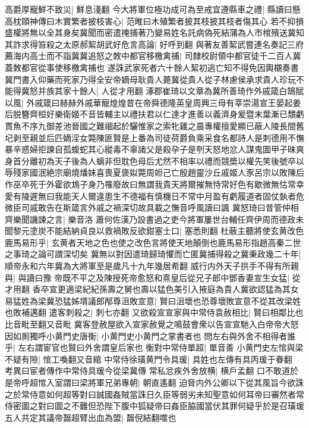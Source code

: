 高爵厚寵鮮不致災|{
	鮮息淺翻}
今大將軍位極功成可為至戒宜遵縣車之禮|{
	縣讀曰懸}
高枕頤神傳曰木實繁者披枝害心|{
	范睢曰木殖繁者披其枝披其枝者傷其心}
若不抑損盛權將無以全其身矣冀聞而密遣掩捕著乃變易姓名託病偽死結蒲為人市棺殯送冀知其詐求得笞殺之太原郝絜胡武好危言高論|{
	好呼到翻}
與著友善絜武嘗連名奏記三府薦海内高士而不詣冀冀追怒之敇中都官移檄禽捕|{
	司隸校尉領中都官徒千二百人冀蓋敇都官從事使移檄禽捕也}
遂誅武家死者六十餘人絜初逃亡知不得免因輿櫬奏書冀門書入仰藥而死家乃得全安帝嫡母耿貴人薨冀從貴人從子林慮侯承求貴人珍玩不能得冀怒并族其家十餘人|{
	人從才用翻}
涿郡崔琦以文章為冀所善琦作外戚箴白鵠賦以風|{
	外戚箴曰赫赫外戚華寵煌煌昔在帝舜德隆英皇周興三母有莘崇湯宣王晏起姜后脱簪齊桓好樂衛姬不音皆輔主以禮扶君以仁達才進善以義濟身爰暨末葉漸已穨虧貫魚不序九御差池晉國之難祻起於驪惟家之索牝雞之晨專權擅愛顯已蔽人陵長間舊圮剥至親並后匹嫡淫女斃陳匪賢是上番為司徒荷爵負乘采食名都詩人是刺德用不憮暴辛惑婦拒諫自孤蝮蛇其心縱毒不辜諸父是殺孕子是刳天怒地忿人謀鬼圖甲子昧爽身首分離初為天子後為人螭非但耽色母后尤然不相率以禮而競奬以權先笑後號卒以辱殘家國泯絶宗廟燒燔妹喜喪夏褒姒斃周妲己亡殷趙靈沙丘戚姬人豕呂宗以敗陳后作巫卒死于外霍欲鴆子身乃罹廢故曰無謂我貴天將爾摧無恃常好色有歇微無怙常幸愛有陵遲無曰我能天人爾違患生不德福有慎機日不常中月盈有虧履道者固仗埶者危微臣司戚敢告在斯箴言外戚之禍深切故具載之憮音呼風讀曰諷}
冀怒琦曰昔管仲相齊樂聞譏諫之言|{
	樂音洛}
蕭何佐漢乃設書過之吏今將軍屢世台輔任齊伊周而德政未聞黎元塗炭不能結納貞良以救禍敗反欲鉗塞士口|{
	塞悉則翻}
杜蔽主聽將使玄黄改色鹿馬易形乎|{
	玄黄者天地之色也使之改色言將使天地顛倒也鹿馬易形指趙高秦二世之事琦之論可謂深切矣}
冀無以對因遣琦歸琦懼而亡匿冀捕得殺之冀秉政幾二十年|{
	順帝永和六年冀為大將軍至是歲凡十九年幾居希翻}
威行内外天子拱手不得有所親與|{
	與讀曰豫}
帝既不平之及陳授死帝愈怒和熹皇后從兄子郎中鄧香妻宣生女猛|{
	從才用翻}
香卒宣更適梁紀紀孫壽之舅也壽以猛色美引入掖庭為貴人冀欲認猛為其女易猛姓為梁冀恐猛姊壻議郎邴尊沮敗宣意|{
	賢曰沮壞也恐尊壞敗宣意不從其改梁姓也敗補邁翻}
遣客刺殺之|{
	刺七亦翻}
又欲殺宣宣家與中常侍袁赦相比|{
	賢曰相鄰比也比音毗至翻又音毗}
冀客登赦屋欲入宣家赦覺之鳴鼓會衆以告宣宣馳入白帝帝大怒因如厠獨呼小黄門史唐衡|{
	小黄門史小黄門之掌書者也}
問左右與外舍不相得者誰乎|{
	左右謂宦官也賢曰外舍謂皇后家也}
衡對中常侍單超|{
	單音善}
小黄門史左悺與梁不疑有隙|{
	悺工喚翻又音綰}
中常侍徐璜黄門令具瑗|{
	具姓也左傳有具丙瑗于眷翻　考異曰宦者傳作中常侍具瑗今從梁冀傳}
常私忿疾外舍放横|{
	横戶孟翻}
口不敢道於是帝呼超悺入室謂曰梁將軍兄弟專朝|{
	朝直遙翻}
迫脅内外公卿以下從其風旨今欲誅之於常侍意如何超等對曰誠國姦賊當誅日久臣等弱劣未知聖意如何耳帝曰審然者常侍密圖之對曰圖之不難但恐陛下腹中狐疑帝曰姦臣脇國當伏其罪何疑乎於是召璜瑗五人共定其議帝齧超臂出血為盟|{
	齧倪結翻噬也}
